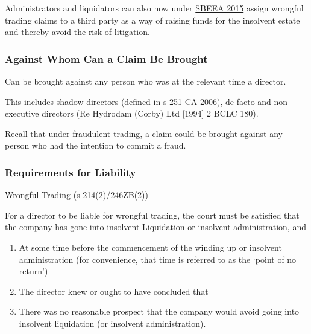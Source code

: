 \documentclass[
]{article}
\providecommand{\tightlist}{%
  \setlength{\itemsep}{0pt}\setlength{\parskip}{0pt}}
\newenvironment{env-f9980082-0043-4b24-aae8-b6167468a442}
{
    \savenotes\tcolorbox[blanker,breakable,left=5pt,borderline west={2pt}{-4pt}{cyan}]
}
{
    \endtcolorbox\spewnotes
}
\begin{document}
Administrators and liquidators can also now under
\href{https://www.legislation.gov.uk/ukpga/2015/26/contents/enacted}{SBEEA
2015} assign wrongful trading claims to a third party as a way of
raising funds for the insolvent estate and thereby avoid the risk of
litigation.

\hypertarget{against-whom-can-a-claim-be-brought}{%
\subsubsection{Against Whom Can a Claim Be
Brought}\label{against-whom-can-a-claim-be-brought}}

Can be brought against any person who was at the relevant time a
director.

This includes shadow directors (defined in
\href{https://www.legislation.gov.uk/ukpga/2006/46/section/251}{s 251 CA
2006}), de facto and non-executive directors (Re Hydrodam (Corby) Ltd
{[}1994{]} 2 BCLC 180).

Recall that under fraudulent trading, a claim could be brought against
any person who had the intention to commit a fraud.

\hypertarget{requirements-for-liability}{%
\subsubsection{Requirements for
Liability}\label{requirements-for-liability}}

\begin{env-f9980082-0043-4b24-aae8-b6167468a442}

Wrongful Trading (s 214(2)/246ZB(2))

For a director to be liable for wrongful trading, the court must be
satisfied that the company has gone into insolvent Liquidation or
insolvent administration, and

\begin{enumerate}
\tightlist
\item
  At some time before the commencement of the winding up or insolvent
  administration (for convenience, that time is referred to as the
  `point of no return')
\item
  The director knew or ought to have concluded that
\item
  There was no reasonable prospect that the company would avoid going
  into insolvent liquidation (or insolvent administration).
\end{enumerate}

\end{env-f9980082-0043-4b24-aae8-b6167468a442}
\end{document}
